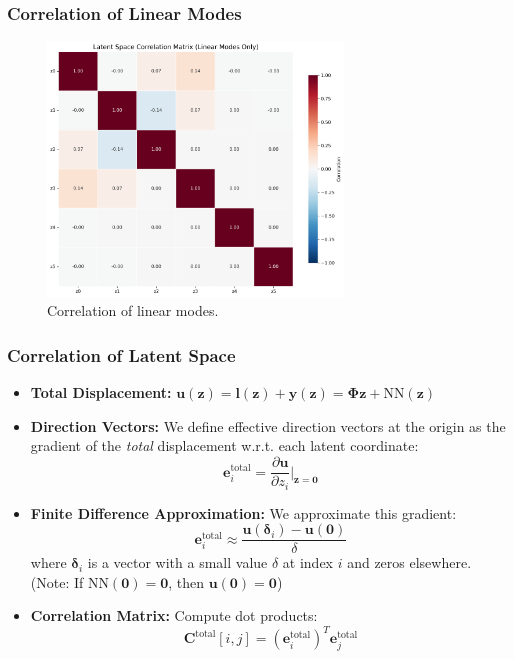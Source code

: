 \documentclass{beamer}
\begin{document}
\begin{frame}
    \frametitle{Correlation of Linear Modes}
    
    \begin{figure}
        \centering
        \includegraphics[width=0.7\textwidth]{Images/latent_correlations_linear_linear.png}
        \caption{Correlation of linear modes.}
        \label{fig:linear_correlation}

    \end{figure}
    \end{frame}

\begin{frame}
    \frametitle{Correlation of Latent Space}
    
    \begin{itemize}
        \item \textbf{Total Displacement:} $\mathbf{u}(\mathbf{z}) = \mathbf{l}(\mathbf{z}) + \mathbf{y}(\mathbf{z}) = \mathbf{\Phi} \mathbf{z} + \text{NN}(\mathbf{z})$
        \item \textbf{Direction Vectors:} We define effective direction vectors at the origin as the gradient of the \textit{total} displacement w.r.t. each latent coordinate:
        \[
            \mathbf{e}_i^{\text{total}} = \frac{\partial \mathbf{u}}{\partial z_i} \bigg|_{\mathbf{z}=\mathbf{0}}
        \]
        \item \textbf{Finite Difference Approximation:} We approximate this gradient:
        \[
            \mathbf{e}_i^{\text{total}} \approx \frac{\mathbf{u}(\boldsymbol{\delta}_i) - \mathbf{u}(\mathbf{0})}{\delta}
        \]
        where $\boldsymbol{\delta}_i$ is a vector with a small value $\delta$ at index $i$ and zeros elsewhere.
        (Note: If $\text{NN}(\mathbf{0})=\mathbf{0}$, then $\mathbf{u}(\mathbf{0})=\mathbf{0}$)
        \item \textbf{Correlation Matrix:} Compute dot products:
        \[
            \mathbf{C}^{\text{total}}[i, j] = (\mathbf{e}_i^{\text{total}})^T \mathbf{e}_j^{\text{total}}
        \]

    \end{itemize}
    
    \end{frame}
\end{document}

